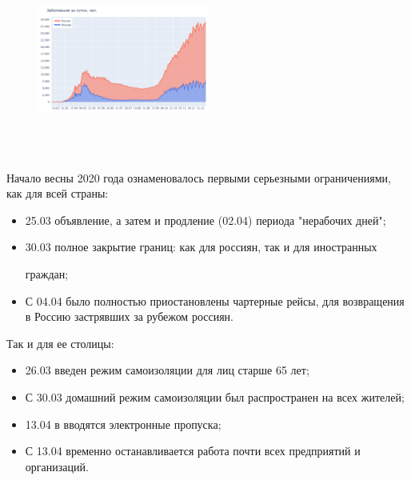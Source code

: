 \documentclass[a4paper, 12pt]{extarticle}
\begin{document}
\begin{figure}
    \centering
    \vspace{-20pt}
    \includegraphics[height=180pt, width=0.50\textwidth]{../plots/1day_confirmed_russia_moscow.pdf}
    \label{fig:day_confirmed_russia_moscow}
\end{figure}

Начало весны 2020 года ознаменовалось первыми серьезными ограничениями, как для всей страны:

\begin{itemize}
    \item 25.03 объявление, а затем и продление (02.04) периода
        "нерабочих дней";
    \item 30.03 полное закрытие границ: как для россиян, так и для иностранных

        граждан;
    \item С 04.04 было полностью приостановлены чартерные рейсы, для
        возвращения в Россию застрявших за рубежом россиян.
\end{itemize}
\vspace{5mm}

Так и для ее столицы:

\begin{itemize}
    \item 26.03 введен режим самоизоляции для лиц старше 65 лет;
    \item С 30.03 домашний режим самоизоляции был распространен на
        всех жителей;
    \item 13.04 в вводятся электронные пропуска;
    \item С 13.04 временно останавливается работа почти всех предприятий и
        организаций.
\end{itemize}

\vspace{5mm}
\end{document}
